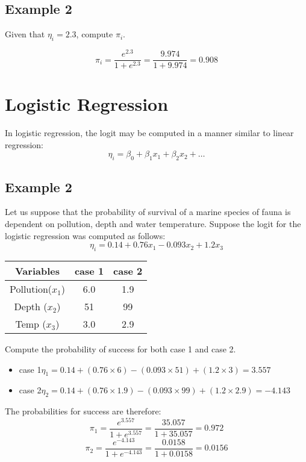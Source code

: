 \subsection{Example 2}
Given that $\eta_i = 2.3$, compute $\pi_i$.

\[ \pi_i  =  \frac{e^{2.3}}{1 + e^{2.3}} = \frac{9.974}{1 + 9.974} = 0.908 \]

\section{Logistic Regression}
In logistic regression, the logit may be computed in a manner similar to linear regression:
\[ \eta_i = \beta_0 + \beta_1x_1 + \beta_2x_2 + \ldots  \]

\subsection{Example 2}
Let us suppose that the probability of survival of a marine species of fauna is dependent on pollution, depth and water temperature. Suppose the logit for the logistic regression was computed as follows:
\[ \eta_i = 0.14 + 0.76x_1 - 0.093x_2 + 1.2x_3  \]
\begin{center}
\begin{tabular}{|c|c|c|}
  \hline
Variables & case 1 & case 2 \\ \hline
Pollution($x_1$) & 6.0 & 1.9 \\
Depth ($x_2$)& 51 & 99 \\
Temp ($x_3$) & 3.0 & 2.9 \\
  \hline
\end{tabular}
\end{center}
Compute the probability of success for both case 1 and case 2.

\begin{itemize}
\item case 1$ \eta_1 = 0.14 + (0.76 \times 6)	- (0.093\times 51) + (1.2\times 3) = 3.557$
\item case 2$ \eta_2 = 0.14 + (0.76 \times 1.9)	- (0.093\times 99) + (1.2\times 2.9) = -4.143$
\end{itemize}

The probabilities for success are therefore:
\[ \pi_1  =  \frac{e^{3.557}}{1 + e^{3.557}} = \frac{35.057}{1 + 35.057} = 0.972 \]
\[ \pi_2  =  \frac{e^{-4.143}}{1 + e^{-4.143}} = \frac{0.0158}{1 + 0.0158} = 0.0156 \]

